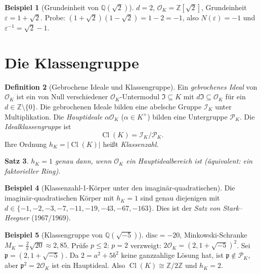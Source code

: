 \documentclass[12pt,a4paper]{amsart}
\newtheorem{theorem}{Satz}[section]
\theoremstyle{definition}
\newtheorem{definition}[theorem]{Definition}
\newtheorem{example}[theorem]{Beispiel}
\newcommand{\Z}{\mathbb{Z}}
\newcommand{\Q}{\mathbb{Q}}
\newcommand{\OK}{\mathcal{O}_K}
\newcommand{\p}{\mathfrak{p}}
\newcommand{\disc}{\mathrm{disc}}
\DeclareMathOperator{\Cl}{Cl}
\begin{document}
\begin{example}[Grundeinheit von $\Q(\sqrt{2})$]
$d=2$, $\OK = \Z[\sqrt{2}]$, Grundeinheit $\varepsilon = 1 + \sqrt{2}$.
Probe: $(1+\sqrt{2})(1-\sqrt{2}) = 1 - 2 = -1$, also $N(\varepsilon) = -1$
und $\varepsilon^{-1} = \sqrt{2}-1$.
\end{example}

\section{Die Klassengruppe}

\begin{definition}[Gebrochene Ideale und Klassengruppe]
Ein \emph{gebrochenes Ideal} von $\OK$ ist ein von Null verschiedener
$\OK$-Untermodul $\mathfrak{I} \subseteq K$ mit $d\mathfrak{I} \subseteq \OK$
für ein $d \in \Z \setminus \{0\}$.  Die gebrochenen Ideale bilden eine
abelsche Gruppe $\mathcal{I}_K$ unter Multiplikation.  Die
\emph{Hauptideale} $\alpha\OK$ ($\alpha \in K^\times$) bilden eine
Untergruppe $\mathcal{P}_K$.  Die \emph{Idealklassengruppe} ist
\[
  \Cl(K) = \mathcal{I}_K / \mathcal{P}_K.
\]
Ihre Ordnung $h_K = |\Cl(K)|$ heißt \emph{Klassenzahl}.
\end{definition}

\begin{theorem}
$h_K = 1$ genau dann, wenn $\OK$ ein Hauptidealbereich ist (äquivalent:
ein faktorieller Ring).
\end{theorem}

\begin{example}[Klassenzahl-1-Körper unter den imaginär-quadratischen]
Die imaginär-quadratischen Körper mit $h_K = 1$ sind genau diejenigen
mit $d \in \{-1, -2, -3, -7, -11, -19, -43, -67, -163\}$.
Dies ist der \emph{Satz von Stark--Heegner} (1967/1969).
\end{example}

\begin{example}[Klassengruppe von $\Q(\sqrt{-5})$]
$\disc = -20$, Minkowski-Schranke $M_K = \frac{2}{\pi}\sqrt{20} \approx 2{,}85$.
Prüfe $p \le 2$: $p = 2$ verzweigt: $2\OK = (2, 1+\sqrt{-5})^2$.
Sei $\p = (2, 1+\sqrt{-5})$.  Da $2 = a^2 + 5b^2$ keine ganzzahlige Lösung
hat, ist $\p \notin \mathcal{P}_K$, aber $\p^2 = 2\OK$ ist ein Hauptideal.
Also $\Cl(K) \cong \Z/2\Z$ und $h_K = 2$.
\end{example}
\end{document}
